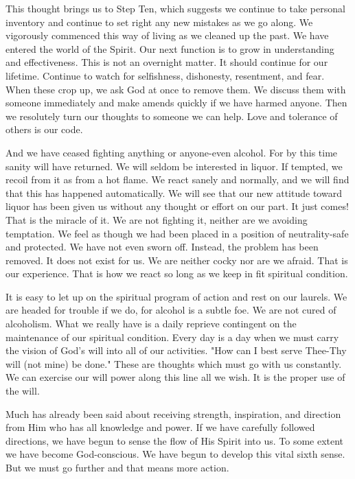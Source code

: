 \begin{biblechapter}
This thought brings us to Step Ten, which suggests we continue to take personal inventory and continue to set right any new mistakes as we go along.  We vigorously commenced this way of living as we cleaned up the past.  We have entered the world of the Spirit.  Our next function is to grow in understanding and effectiveness.  This is not an overnight matter.  It should continue for our lifetime.  Continue to watch for selfishness, dishonesty, resentment, and fear.  When these crop up, we ask God at once to remove them.  We discuss them with someone immediately and make amends quickly if we have harmed anyone.  Then we resolutely turn our thoughts to someone we can help.  Love and tolerance of others is our code.

And we have ceased fighting anything or anyone-even alcohol.  For by this time sanity will have returned.  We will seldom be interested in liquor.  If tempted, we recoil from it as from a hot flame.  We react sanely and normally, and we will find that this has happened automatically.  We will see that our new attitude toward liquor has been given us without any thought or effort on our part.  It just comes!  That is the miracle of it.  We are not fighting it, neither are we avoiding temptation.  We feel as though we had been placed in a position of neutrality-safe and protected.  We have not even sworn off.  Instead, the problem has been removed.  It does not exist for us.  We are neither cocky nor are we afraid.  That is our experience.  That is how we react so long as we keep in fit spiritual condition.

It is easy to let up on the spiritual program of action and rest on our laurels.  We are headed for trouble if we do, for alcohol is a subtle foe.  We are not cured of alcoholism.  What we really have is a daily reprieve contingent on the maintenance of our spiritual condition.  Every day is a day when we must carry the vision of God's will into all of our activities.  "How can I best serve Thee-Thy will (not mine) be done."  These are thoughts which must go with us constantly.  We can exercise our will power along this line all we wish.  It is the proper use of the will.

Much has already been said about receiving strength, inspiration, and direction from Him who has all knowledge and power.  If we have carefully followed directions, we have begun to sense the flow of His Spirit into us.  To some extent we have become God-conscious.  We have begun to develop this vital sixth sense.  But we must go further and that means more action.


\end{biblechapter}
